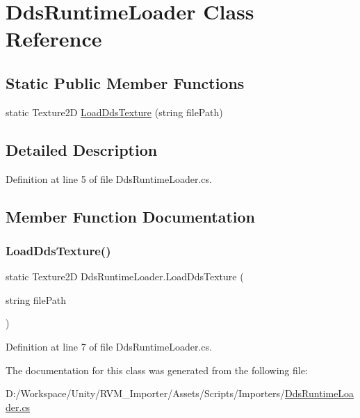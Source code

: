 \hypertarget{class_dds_runtime_loader}{}\section{Dds\+Runtime\+Loader Class Reference}
\label{class_dds_runtime_loader}
\subsection*{Static Public Member Functions}
\begin{DoxyCompactItemize}
\item 
static Texture2D \mbox{\hyperlink{class_dds_runtime_loader_aeaf168419bc9b2b84a510944d33bf364}{Load\+Dds\+Texture}} (string file\+Path)
\end{DoxyCompactItemize}


\subsection{Detailed Description}


Definition at line 5 of file Dds\+Runtime\+Loader.\+cs.



\subsection{Member Function Documentation}
\mbox{\label{class_dds_runtime_loader_aeaf168419bc9b2b84a510944d33bf364}} 
\subsubsection{\texorpdfstring{LoadDdsTexture()}{LoadDdsTexture()}}
{\footnotesize\ttfamily static Texture2D Dds\+Runtime\+Loader.\+Load\+Dds\+Texture (\begin{DoxyParamCaption}\item[{string}]{file\+Path }\end{DoxyParamCaption})\hspace{0.3cm}{\ttfamily [static]}}



Definition at line 7 of file Dds\+Runtime\+Loader.\+cs.



The documentation for this class was generated from the following file\+:\begin{DoxyCompactItemize}
\item 
D\+:/\+Workspace/\+Unity/\+R\+V\+M\+\_\+\+Importer/\+Assets/\+Scripts/\+Importers/\mbox{\hyperlink{_dds_runtime_loader_8cs}{Dds\+Runtime\+Loader.\+cs}}\end{DoxyCompactItemize}
